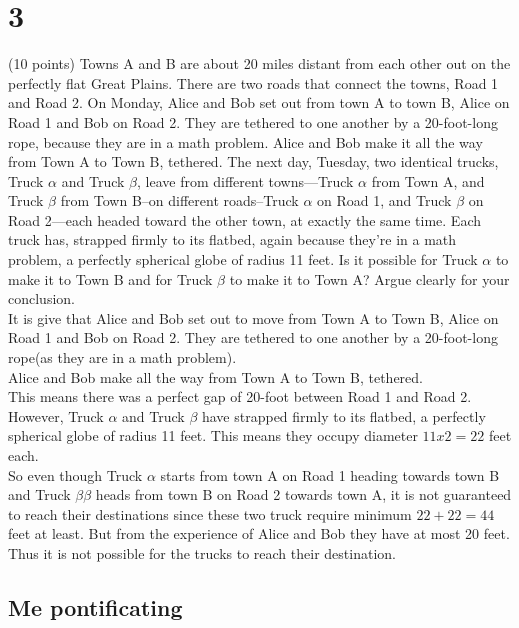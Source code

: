 \newpage




\section*{3}
(10 points) Towns A and B are about 20 miles distant from each other out on the perfectly flat Great Plains. There are two roads that connect the towns, Road 1 and Road 2. On Monday, Alice and Bob set out from town A to town B, Alice on Road 1 and Bob on Road 2.  They are tethered to one another by a 20-foot-long rope, because they are in a math problem.   Alice and Bob make it all the way from Town A to Town B, tethered.  The next day, Tuesday, two identical trucks, Truck $\alpha$ and Truck $\beta$, leave from different towns—Truck $\alpha$ from Town A, and Truck $\beta$ from Town B--on different roads--Truck $\alpha$ on Road 1, and Truck $\beta$ on Road 2—each headed toward the other town, at exactly the same time.  Each truck has, strapped firmly to its flatbed, again because they’re in a math problem, a perfectly spherical globe of radius 11 feet.  Is it possible for Truck $\alpha$ to make it to Town B and for Truck $\beta$ to make it to Town A? Argue clearly for your conclusion. 
\\ 

It is give that Alice and Bob set out to move from Town A to Town B, Alice on Road 1 and Bob on Road 2. They are tethered to one another by a 20-foot-long rope(as they are in a math problem). \\
Alice and Bob make all the way from Town A to Town B, tethered. \\ 
This means there was a perfect gap of 20-foot between Road 1 and Road 2. \\
However, Truck $\alpha$ and Truck $\beta$ have strapped firmly to its flatbed, a perfectly spherical globe of radius 11 feet. This means they occupy diameter $11 x 2=22$ feet each. \\ 
So even though Truck $\alpha$ starts from town A on Road 1 heading towards town B and Truck $\beta \beta$ heads from town B on Road 2 towards town A, it is not guaranteed to reach their destinations since these two truck require minimum $22+22=44$ feet at least. But from the experience of Alice and Bob they have at most 20 feet. \\ 
Thus it is not possible for the trucks to reach their destination. 

\subsection*{Me pontificating}


